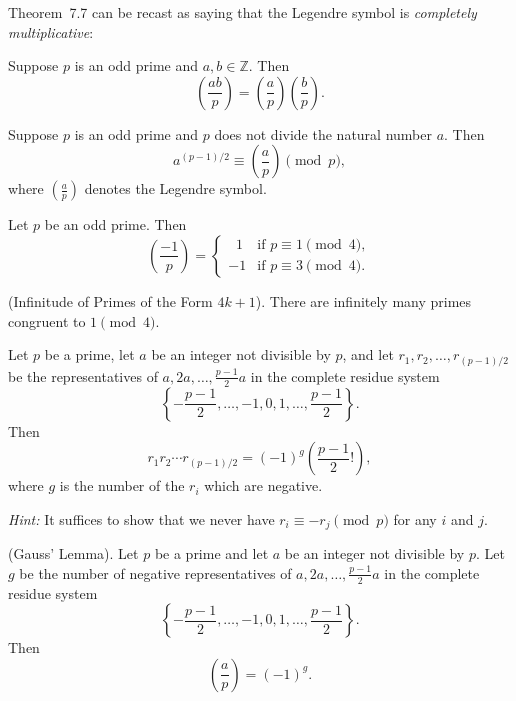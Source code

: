 \documentclass{article}
\theoremstyle{definition}
\newenvironment{manualtheorem}[1]{%
  \renewcommand{\thetheorem}{#1}%
  \theorem%
}{%
  \endtheorem%
}
\begin{document}
Theorem~7.7 can be recast as saying that the Legendre symbol is \emph{completely multiplicative}:

\begin{manualtheorem}{7.8}
	Suppose $p$ is an odd prime and $a,b \in \mathbb{Z}$. Then
	\[
		\left( \frac{ab}{p} \right)
		= \left( \frac{a}{p} \right)
		\left( \frac{b}{p} \right).
	\]
\end{manualtheorem}

\begin{manualtheorem}{7.9}[Euler’s Criterion]
	Suppose $p$ is an odd prime and $p$ does not divide the natural number $a$. Then
	\[
		a^{(p-1)/2} \equiv
		\left( \frac{a}{p} \right) \pmod{p},
	\]
	where $\left( \frac{a}{p} \right)$ denotes the Legendre symbol.
\end{manualtheorem}

\begin{manualtheorem}{7.10}
	Let $p$ be an odd prime. Then
	\[
		\left( \frac{-1}{p} \right) =
		\begin{cases}
			\;\;1 & \text{if } p \equiv 1 \pmod{4}, \\
			-1    & \text{if } p \equiv 3 \pmod{4}.
		\end{cases}
	\]
\end{manualtheorem}

\begin{manualtheorem}{7.12}
	(Infinitude of Primes of the Form $4k+1$).
	There are infinitely many primes congruent to $1 \pmod{4}$.
\end{manualtheorem}

\begin{manualtheorem}{7.13}
	Let $p$ be a prime, let $a$ be an integer not divisible by $p$, and let
	$r_1, r_2, \dots, r_{(p-1)/2}$ be the representatives of
	$a, 2a, \dots, \frac{p-1}{2}a$ in the complete residue system
	\[
		\left\{
		-\frac{p-1}{2}, \dots, -1, 0, 1, \dots, \frac{p-1}{2}
		\right\}.
	\]
	Then
	\[
		r_1 r_2 \cdots r_{(p-1)/2}
		= (-1)^{g} \left( \frac{p-1}{2}! \right),
	\]
	where $g$ is the number of the $r_i$ which are negative.

	\emph{Hint:} It suffices to show that we never have
	$r_i \equiv -r_j \pmod{p}$ for any $i$ and $j$.
\end{manualtheorem}

\begin{manualtheorem}{7.14}
	(Gauss' Lemma).
	Let $p$ be a prime and let $a$ be an integer not divisible by $p$.
	Let $g$ be the number of negative representatives of
	$a, 2a, \dots, \frac{p-1}{2}a$ in the complete residue system
	\[
		\left\{
		-\frac{p-1}{2}, \dots, -1, 0, 1, \dots, \frac{p-1}{2}
		\right\}.
	\]
	Then
	\[
		\left( \frac{a}{p} \right) = (-1)^g.
	\]
\end{manualtheorem}
\end{document}
